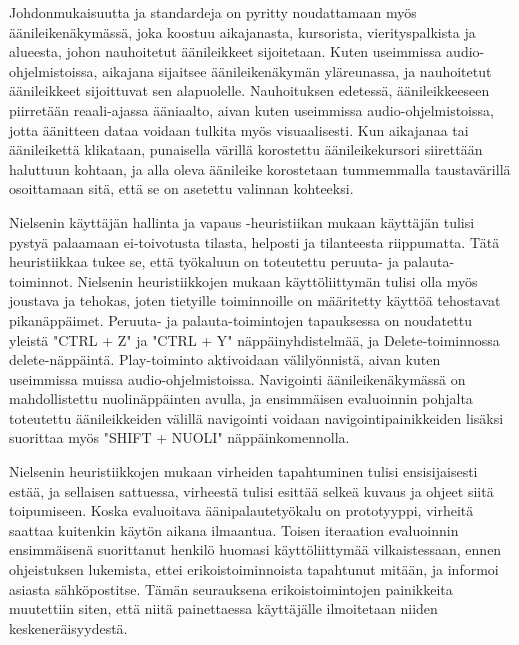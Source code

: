 \documentclass[utf8]{gradu3}
\begin{document}
Johdonmukaisuutta ja standardeja on pyritty noudattamaan myös äänileikenäkymässä, joka koostuu aikajanasta, kursorista, vierityspalkista ja alueesta, johon nauhoitetut äänileikkeet sijoitetaan. Kuten useimmissa audio-ohjelmistoissa, aikajana sijaitsee äänileikenäkymän yläreunassa, ja nauhoitetut äänileikkeet sijoittuvat sen alapuolelle. Nauhoituksen edetessä, äänileikkeeseen piirretään reaali-ajassa ääniaalto, aivan kuten useimmissa audio-ohjelmistoissa, jotta äänitteen dataa voidaan tulkita myös visuaalisesti. 
Kun aikajanaa tai äänileikettä klikataan, punaisella värillä korostettu äänileikekursori siirettään haluttuun kohtaan, ja alla oleva äänileike korostetaan tummemmalla taustavärillä osoittamaan sitä, että se on asetettu valinnan kohteeksi.

Nielsenin käyttäjän hallinta ja vapaus -heuristiikan mukaan käyttäjän tulisi pystyä palaamaan ei-toivotusta tilasta, helposti ja tilanteesta riippumatta. Tätä heuristiikkaa tukee se, että työkaluun on toteutettu peruuta- ja palauta-toiminnot. Nielsenin heuristiikkojen mukaan käyttöliittymän tulisi olla myös joustava ja tehokas, joten tietyille toiminnoille on määritetty käyttöä tehostavat pikanäppäimet. Peruuta- ja palauta-toimintojen tapauksessa on noudatettu yleistä "CTRL + Z" ja "CTRL + Y" näppäinyhdistelmää, ja Delete-toiminnossa delete-näppäintä. Play-toiminto aktivoidaan välilyönnistä, aivan kuten useimmissa muissa audio-ohjelmistoissa. Navigointi äänileikenäkymässä on mahdollistettu nuolinäppäinten avulla, ja ensimmäisen evaluoinnin pohjalta toteutettu äänileikkeiden välillä navigointi voidaan navigointipainikkeiden lisäksi suorittaa myös "SHIFT + NUOLI" näppäinkomennolla.

Nielsenin heuristiikkojen mukaan virheiden tapahtuminen tulisi ensisijaisesti estää, ja sellaisen sattuessa, virheestä tulisi esittää selkeä kuvaus ja ohjeet siitä toipumiseen. Koska evaluoitava äänipalautetyökalu on prototyyppi, virheitä saattaa kuitenkin käytön aikana  ilmaantua. Toisen iteraation evaluoinnin ensimmäisenä suorittanut henkilö huomasi käyttöliittymää vilkaistessaan, ennen ohjeistuksen lukemista, ettei erikoistoiminnoista tapahtunut mitään, ja informoi asiasta sähköpostitse. Tämän seurauksena erikoistoimintojen painikkeita muutettiin siten, että niitä painettaessa käyttäjälle ilmoitetaan niiden keskeneräisyydestä.
\end{document}
